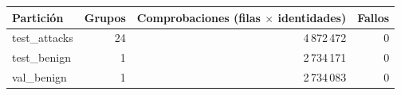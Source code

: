 \begin{tabular}{@{}lrrr@{}}
\toprule
Partición & Grupos & Comprobaciones (filas $\times$ identidades) & Fallos \\
\midrule
test\_attacks & 24 & 4\,872\,472 & 0 \\
test\_benign & 1 & 2\,734\,171 & 0 \\
val\_benign & 1 & 2\,734\,083 & 0 \\
\bottomrule
\end{tabular}
